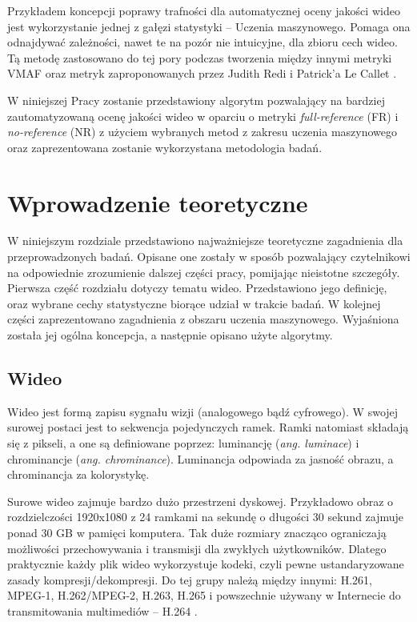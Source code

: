 Przykładem koncepcji poprawy trafności dla automatycznej oceny jakości wideo jest wykorzystanie jednej z gałęzi statystyki -- Uczenia maszynowego. Pomaga ona odnajdywać zależności, nawet te na pozór nie intuicyjne, dla zbioru cech wideo. Tą metodę zastosowano do tej pory podczas tworzenia między innymi metryki VMAF oraz metryk zaproponowanych przez Judith Redi \cite{metryka1} i Patrick'a Le Callet \cite{metryka2}.


W niniejszej Pracy zostanie przedstawiony algorytm pozwalający na bardziej zautomatyzowaną ocenę jakości wideo w oparciu o metryki \emph{full-reference} (FR) i \emph{no-reference} (NR) z użyciem wybranych metod z zakresu uczenia maszynowego oraz zaprezentowana zostanie wykorzystana metodologia badań.


\chapter{Wprowadzenie teoretyczne}
\label{cha:pierwszyDokument}

W niniejszym rozdziale przedstawiono najważniejsze teoretyczne zagadnienia dla przeprowadzonych badań. Opisane one zostały w sposób pozwalający czytelnikowi na odpowiednie zrozumienie dalszej części pracy, pomijając nieistotne szczegóły. Pierwsza część rozdziału dotyczy tematu wideo. Przedstawiono jego definicję, oraz wybrane cechy statystyczne biorące udział w trakcie badań. W kolejnej części zaprezentowano zagadnienia z obszaru uczenia maszynowego. Wyjaśniona została jej ogólna koncepcja, a następnie opisano użyte algorytmy.


\section{Wideo}

Wideo jest formą zapisu sygnału wizji (analogowego bądź cyfrowego). W swojej surowej postaci jest to sekwencja pojedynczych ramek. Ramki natomiast składają się z pikseli, a one są definiowane poprzez: luminancję ({\em ang. luminace}) i chrominancje ({\em ang. chrominance}). Luminancja odpowiada za jasność obrazu, a chrominancja za kolorystykę. 

Surowe wideo zajmuje bardzo dużo przestrzeni dyskowej. Przykładowo obraz o rozdzielczości 1920x1080 z 24 ramkami na sekundę o długości 30 sekund zajmuje ponad 30 GB w pamięci komputera. Tak duże rozmiary znacząco ograniczają możliwości przechowywania i transmisji dla zwykłych użytkowników. Dlatego praktycznie każdy plik wideo wykorzystuje kodeki, czyli pewne ustandaryzowane zasady kompresji/dekompresji. Do tej grupy należą między innymi: H.261, MPEG-1, H.262/MPEG-2, H.263, H.265 i powszechnie używany w Internecie do transmitowania multimediów --  H.264 \cite{video_codecs}. 

